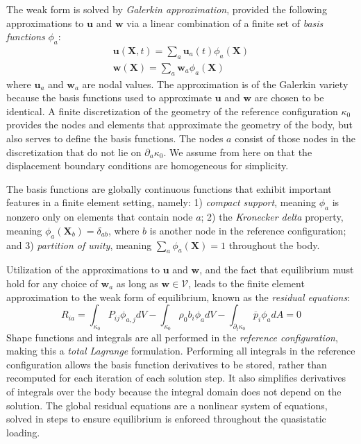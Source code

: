 The weak form is solved by \textit{Galerkin approximation}, provided the following approximations to $\bm{u}$ and $\bm{w}$ via a linear combination of a finite set of \textit{basis functions} $\phi_a$:
\begin{gather}
\bm{u}(\bm{X},t) = \sum\limits_{a}\bm{u}_a(t)\phi_a(\bm{X}) \\
\bm{w}(\bm{X}) = \sum\limits_{a}\bm{w}_a\phi_a(\bm{X})
\end{gather}
where $\bm{u}_a$ and $\bm{w}_a$ are nodal values. The approximation is of the Galerkin variety because the basis functions used to approximate $\bm{u}$ and $\bm{w}$ are chosen to be identical. A finite discretization of the geometry of the reference configuration $\kappa_0$ provides the nodes and elements that approximate the geometry of the body, but also serves to define the basis functions. The nodes $a$ consist of those nodes in the discretization that do not lie on $\partial_a\kappa_0$. We assume from here on that the displacement boundary conditions are homogeneous for simplicity.

The basis functions are globally continuous functions that exhibit important features in a finite element setting, namely: 1) \textit{compact support}, meaning $\phi_a$ is nonzero only on elements that contain node $a$; 2) the \textit{Kronecker delta} property, meaning $\phi_a(\bm{X}_b) = \delta_{ab}$, where $b$ is another node in the reference configuration; and 3) \textit{partition of unity}, meaning $\sum\limits_a\phi_a(\bm{X}) = 1$ throughout the body.

Utilization of the approximations to $\bm{u}$ and $\bm{w}$, and the fact that equilibrium must hold for any choice of $\bm{w}_a$ as long as $\bm{w} \in \mathcal{V}$, leads to the finite element approximation to the weak form of equilibrium, known as the \textit{residual equations}:
\begin{equation}
R_{ia} = \int_{\kappa_0}P_{ij}\phi_{a,j}dV - \int_{\kappa_0}\rho_0b_i\phi_adV - \int_{\partial_t\kappa_0} \overline{p}_i\phi_adA = 0
\label{eqn:elresid}
\end{equation}
Shape functions and integrals are all performed in the \textit{reference configuration}, making this a \textit{total Lagrange} formulation. Performing all integrals in the reference configuration allows the basis function derivatives to be stored, rather than recomputed for each iteration of each solution step. It also simplifies derivatives of integrals over the body because the integral domain does not depend on the solution. The global residual equations are a nonlinear system of equations, solved in steps to ensure equilibrium is enforced throughout the quasistatic loading.

